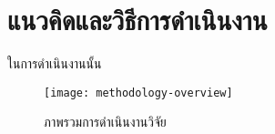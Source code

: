 \section{แนวคิดและวิธีการดำเนินงาน}

ในการดำเนินงานนั้น

\clearpage
\begin{landscape}
    \begin{figure}[h!]
        \centering
        \texttt{[image: methodology-overview]}
        \caption{ภาพรวมการดำเนินงานวิจัย}
        \label{fig:methodologyoverview}
    \end{figure}
\end{landscape}
